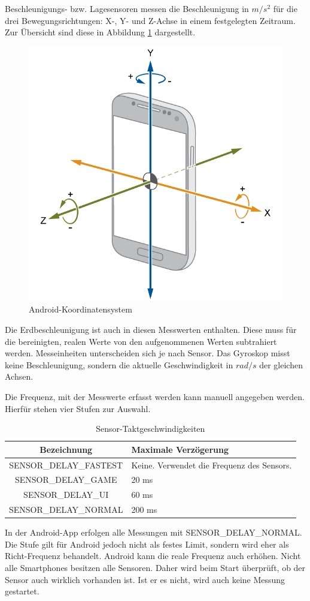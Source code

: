 \documentclass[11pt,a4paper]{report}
\begin{document}
Beschleunigungs- bzw. Lagesensoren messen die Beschleunigung in $m/s^2$ für die drei Bewegungsrichtungen: X-, Y- und Z-Achse in einem festgelegten Zeitraum.
Zur Übersicht sind diese in Abbildung \ref{fig:and_axes} dargestellt.
\begin{figure}[htbp]
  \centering
  \includegraphics[width=.7\textwidth]{images/android_axes.png}
  \caption{Android-Koordinatensystem}
  \label{fig:and_axes}
\end{figure}
Die Erdbeschleunigung ist auch in diesen Messwerten enthalten.
Diese muss für die bereinigten, realen Werte von den aufgenommenen Werten subtrahiert werden\cite{accel_g}.
Messeinheiten unterscheiden sich je nach Sensor.
Das Gyroskop misst keine Beschleunigung, sondern die aktuelle Geschwindigkeit in $rad/s$ der gleichen Achsen.

Die Frequenz, mit der Messwerte erfasst werden kann manuell angegeben werden.
Hierfür stehen vier Stufen zur Auswahl.
\begin{table}[htbp]
  \centering
  \begin{tabular}{|c|p{4cm}|}
      \hline
      \textbf{Bezeichnung} & \textbf{Maximale Verzögerung} \\
	  \hline
      SENSOR\_DELAY\_FASTEST & Keine. Verwendet die Frequenz des Sensors.\\
      \hline
      SENSOR\_DELAY\_GAME & 20 ms\\
      \hline
      SENSOR\_DELAY\_UI & 60 ms\\
      \hline
      SENSOR\_DELAY\_NORMAL & 200 ms\\
      \hline
  \end{tabular}
  \caption{Sensor-Taktgeschwindigkeiten\cite{sensor-takt}}
  \label{tab:sensor_speeds}
\end{table}
In der Android-App erfolgen alle Messungen mit SENSOR\_DELAY\_NORMAL.
Die Stufe gilt für Android jedoch nicht als festes Limit, sondern wird eher als Richt-Frequenz behandelt.
Android kann die reale Frequenz auch erhöhen.
Nicht alle Smartphones besitzen alle Sensoren.
Daher wird beim Start überprüft, ob der Sensor auch wirklich vorhanden ist.
Ist er es nicht, wird auch keine Messung gestartet.
\end{document}
